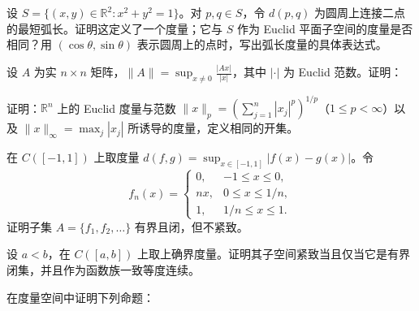\noindent\begin{minipage}{\textwidth}
设 $S=\{(x,y)\in\mathbb R^2:x^2+y^2=1\}$。对 $p,q\in S$，令 $d(p,q)$ 为圆周上连接二点的最短弧长。证明这定义了一个度量；它与 $S$ 作为 Euclid 平面子空间的度量是否相同？用 $(\cos\theta,\sin\theta)$ 表示圆周上的点时，写出弧长度量的具体表达式。
\end{minipage}\par\vfill
\noindent\begin{minipage}{\textwidth}
设 $A$ 为实 $n\times n$ 矩阵，$\displaystyle\|A\|=\sup_{x\ne0}\frac{|Ax|}{|x|}$，其中 $|\cdot|$ 为 Euclid 范数。证明：
\end{minipage}\par\vfill
\noindent\begin{minipage}{\textwidth}
证明：$\mathbb R^n$ 上的 Euclid 度量与范数 $\|x\|_p=(\sum_{j=1}^n|x_j|^p)^{1/p}$（$1\le p<\infty$）以及 $\|x\|_\infty=\max_j|x_j|$ 所诱导的度量，定义相同的开集。
\end{minipage}\par\vfill
\newpage
\noindent\begin{minipage}{\textwidth}
在 $C([-1,1])$ 上取度量 $d(f,g)=\sup_{x\in[-1,1]}|f(x)-g(x)|$。令\[f_n(x)=\begin{cases}0,&-1\le x\le0,\\nx,&0\le x\le1/n,\\1,&1/n\le x\le1.\end{cases}\]证明子集 $A=\{f_1,f_2,\ldots\}$ 有界且闭，但不紧致。
\end{minipage}\par\vfill
\noindent\begin{minipage}{\textwidth}
设 $a<b$，在 $C([a,b])$ 上取上确界度量。证明其子空间紧致当且仅当它是有界闭集，并且作为函数族一致等度连续。
\end{minipage}\par\vfill
\noindent\begin{minipage}{\textwidth}
在度量空间中证明下列命题：
\end{minipage}\par\vfill

